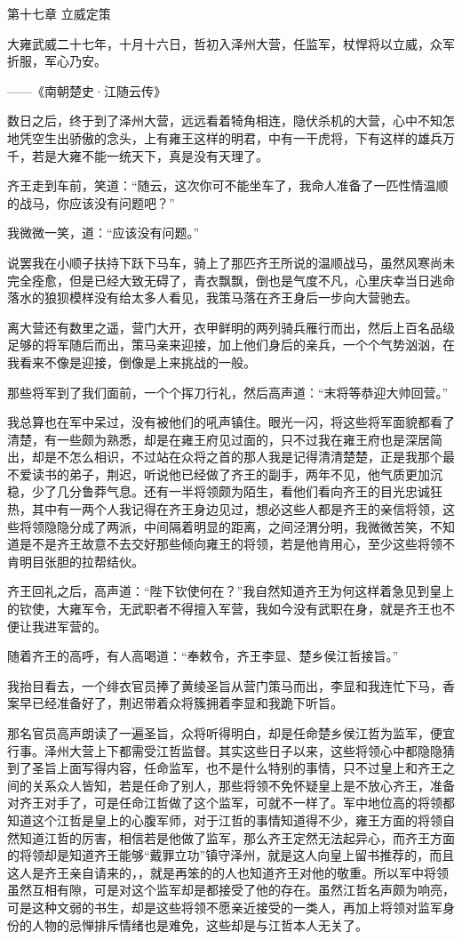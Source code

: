 第十七章    立威定策

大雍武威二十七年，十月十六日，哲初入泽州大营，任监军，杖悍将以立威，众军折服，军心乃安。

——《南朝楚史·江随云传》

数日之后，终于到了泽州大营，远远看着犄角相连，隐伏杀机的大营，心中不知怎地凭空生出骄傲的念头，上有雍王这样的明君，中有一干虎将，下有这样的雄兵万千，若是大雍不能一统天下，真是没有天理了。

齐王走到车前，笑道：“随云，这次你可不能坐车了，我命人准备了一匹性情温顺的战马，你应该没有问题吧？”

我微微一笑，道：“应该没有问题。”

说罢我在小顺子扶持下跃下马车，骑上了那匹齐王所说的温顺战马，虽然风寒尚未完全痊愈，但是已经大致无碍了，青衣飘飘，倒也是气度不凡，心里庆幸当日逃命落水的狼狈模样没有给太多人看见，我策马落在齐王身后一步向大营驰去。

离大营还有数里之遥，营门大开，衣甲鲜明的两列骑兵雁行而出，然后上百名品级足够的将军随后而出，策马亲来迎接，加上他们身后的亲兵，一个个气势汹汹，在我看来不像是迎接，倒像是上来挑战的一般。

那些将军到了我们面前，一个个挥刀行礼，然后高声道：“末将等恭迎大帅回营。”

我总算也在军中呆过，没有被他们的吼声镇住。眼光一闪，将这些将军面貌都看了清楚，有一些颇为熟悉，却是在雍王府见过面的，只不过我在雍王府也是深居简出，却是不怎么相识，不过站在众将之首的那人我是记得清清楚楚，正是我那个最不爱读书的弟子，荆迟，听说他已经做了齐王的副手，两年不见，他气质更加沉稳，少了几分鲁莽气息。还有一半将领颇为陌生，看他们看向齐王的目光忠诚狂热，其中有一两个人我记得在齐王身边见过，想必这些人都是齐王的亲信将领，这些将领隐隐分成了两派，中间隔着明显的距离，之间泾渭分明，我微微苦笑，不知道是不是齐王故意不去交好那些倾向雍王的将领，若是他肯用心，至少这些将领不肯明目张胆的拉帮结伙。

齐王回礼之后，高声道：“陛下钦使何在？”我自然知道齐王为何这样着急见到皇上的钦使，大雍军令，无武职者不得擅入军营，我如今没有武职在身，就是齐王也不便让我进军营的。

随着齐王的高呼，有人高喝道：“奉敕令，齐王李显、楚乡侯江哲接旨。”

我抬目看去，一个绯衣官员捧了黄绫圣旨从营门策马而出，李显和我连忙下马，香案早已经准备好了，荆迟带着众将簇拥着李显和我跪下听旨。

那名官员高声朗读了一遍圣旨，众将听得明白，却是任命楚乡侯江哲为监军，便宜行事。泽州大营上下都需受江哲监督。其实这些日子以来，这些将领心中都隐隐猜到了圣旨上面写得内容，任命监军，也不是什么特别的事情，只不过皇上和齐王之间的关系众人皆知，若是任命了别人，那些将领不免怀疑皇上是不放心齐王，准备对齐王对手了，可是任命江哲做了这个监军，可就不一样了。军中地位高的将领都知道这个江哲是皇上的心腹军师，对于江哲的事情知道得不少，雍王方面的将领自然知道江哲的厉害，相信若是他做了监军，那么齐王定然无法起异心，而齐王方面的将领却是知道齐王能够“戴罪立功”镇守泽州，就是这人向皇上留书推荐的，而且这人是齐王亲自请来的，，就是再笨的的人也知道齐王对他的敬重。所以军中将领虽然互相有隙，可是对这个监军却是都接受了他的存在。虽然江哲名声颇为响亮，可是这种文弱的书生，却是这些将领不愿亲近接受的一类人，再加上将领对监军身份的人物的忌惮排斥情绪也是难免，这些却是与江哲本人无关了。

